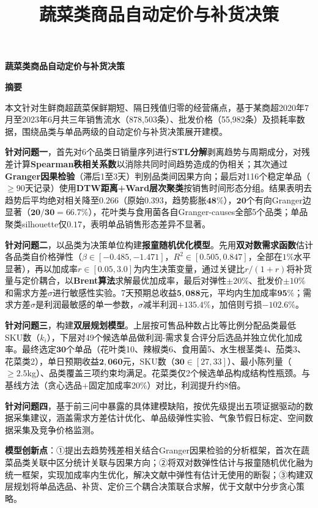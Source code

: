 \documentclass[12pt,a4paper]{article}
\title{\textbf{蔬菜类商品自动定价与补货决策}}
\author{}
\date{}
\begin{document}
\vspace*{-2.5cm}
\begin{center}
{\LARGE\bfseries 蔬菜类商品自动定价与补货决策}
\end{center}
\vspace{0.3em}

\begin{center}
{\Large\bfseries 摘\quad 要}
\end{center}
\vspace{0.2em}

{\normalsize\setlength{\parskip}{0.1em}\setlength{\parindent}{2em}
本文针对生鲜商超蔬菜保鲜期短、隔日残值归零的经营痛点，基于某商超2020年7月至2023年6月共三年销售流水（878,503条）、批发价格（55,982条）及损耗率数据，围绕品类与单品两级的自动定价与补货决策展开建模。

\textbf{针对问题一}，首先对6个品类日销量序列进行\textbf{STL分解}剥离趋势与周期成分，对残差计算\textbf{Spearman秩相关系数}以消除共同时间趋势造成的伪相关；其次通过\textbf{Granger因果检验}（滞后1至3天）判别品类间因果方向；最后对116个稳定单品（$\geq 90$天记录）使用\textbf{DTW距离+Ward层次聚类}按销售时间形态分组。结果表明去趋势后平均绝对相关降至$\mathbf{0.266}$（原始$\mathbf{0.393}$，趋势膨胀$\mathbf{48\%}$），$\mathbf{20}$个有向Granger边显著（$\mathbf{20/30=66.7\%}$），花叶类与食用菌各自Granger-causes全部5个品类；单品聚类silhouette仅$\mathbf{0.17}$，表明单品销售形态差异不显著。

\textbf{针对问题二}，以品类为决策单位构建\textbf{报童随机优化模型}。先用\textbf{双对数需求函数}估计各品类自价格弹性（$\beta\in[-0.485,-1.471]$，$R^2\in[0.505,0.847]$，全部在$1\%$水平显著），再以加成率$r\in[0.05,3.0]$为内生决策变量，通过关键比$r/(1+r)$将补货量与定价耦合，以\textbf{Brent算法}求解最优加成率，最后对弹性$\pm20\%$、批发价$\pm10\%$和需求方差$\sigma$进行敏感性实验。7天预期总收益$\mathbf{5,088}$元，平均内生加成率$\mathbf{95\%}$；需求方差$\sigma$是利润最敏感的单一参数，$\sigma$减半利润$\mathbf{+135.4\%}$，加倍则亏损$\mathbf{-102.6\%}$。

\textbf{针对问题三}，构建\textbf{双层规划模型}。上层按可售品种数占比等比例分配品类最低SKU数（$k_i$），下层对49个候选单品做利润-需求复合评分后选品并独立优化加成率。最终选定$\mathbf{30}$个单品（花叶类10、辣椒类6、食用菌5、水生根茎类4、茄类3、花菜类2），单日预期收益$\mathbf{2,060}$元，SKU数（$\mathbf{30}\in[27,33]$）、最小陈列量（$\geq\mathbf{2.5}$kg）、品类覆盖三项约束均满足。花菜类仅2个候选单品构成结构性瓶颈。与基线方法（贪心选品+固定加成率20\%）对比，利润提升约8倍。

\textbf{针对问题四}，基于前三问中暴露的具体建模缺陷，按优先级提出五项证据驱动的数据采集建议，涵盖需求方差估计优化、单品级弹性实验、气象节假日标定、空间数据采集及竞争价格监测。

\textbf{模型创新点}：①提出去趋势残差相关结合Granger因果检验的分析框架，首次在蔬菜品类关联中区分统计关联与因果方向；②将双对数弹性估计与报童随机优化融为统一框架，实现加成率内生优化，解决文献中弹性有估计无使用的断裂；③构建双层规划将单品选品、补货、定价三个耦合决策联合求解，优于文献中分步贪心策略。
}
\end{document}

